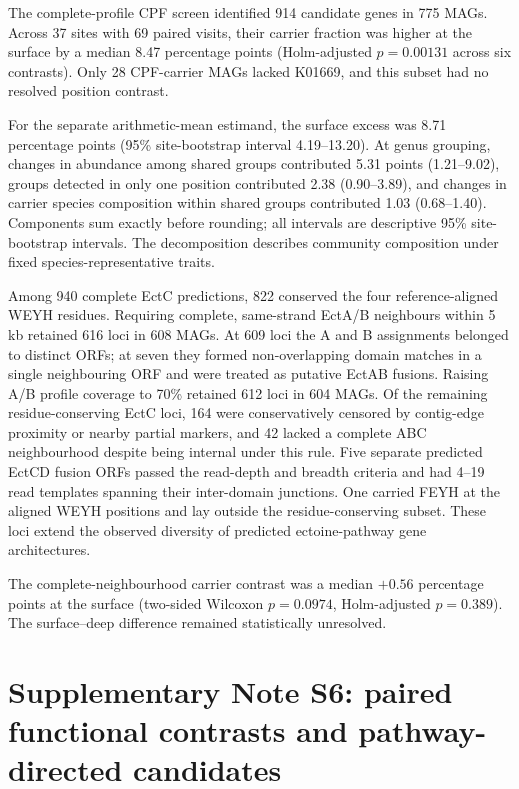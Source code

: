 The complete-profile CPF screen identified 914 candidate genes in 775 MAGs. Across 37 sites with 69 paired visits, their carrier fraction was higher at the surface by a median 8.47 percentage points (Holm-adjusted $p=0.00131$ across six contrasts). Only 28 CPF-carrier MAGs lacked K01669, and this subset had no resolved position contrast.

For the separate arithmetic-mean estimand, the surface excess was 8.71 percentage points (95\% site-bootstrap interval 4.19--13.20). At genus grouping, changes in abundance among shared groups contributed 5.31 points (1.21--9.02), groups detected in only one position contributed 2.38 (0.90--3.89), and changes in carrier species composition within shared groups contributed 1.03 (0.68--1.40). Components sum exactly before rounding; all intervals are descriptive 95\% site-bootstrap intervals.   The decomposition describes community composition under fixed species-representative traits.

Among 940 complete EctC predictions, 822 conserved the four reference-aligned WEYH residues. Requiring complete, same-strand EctA/B neighbours within 5 kb retained 616 loci in 608 MAGs. At 609 loci the A and B assignments belonged to distinct ORFs; at seven they formed non-overlapping domain matches in a single neighbouring ORF and were treated as putative EctAB fusions. Raising A/B profile coverage to 70\% retained 612 loci in 604 MAGs. Of the remaining residue-conserving EctC loci, 164 were conservatively censored by contig-edge proximity or nearby partial markers, and 42 lacked a complete ABC neighbourhood despite being internal under this rule. Five separate predicted EctCD fusion ORFs passed the read-depth and breadth criteria and had 4--19 read templates spanning their inter-domain junctions. One carried FEYH at the aligned WEYH positions and lay outside the residue-conserving subset. These loci extend the observed diversity of predicted ectoine-pathway gene architectures.

The complete-neighbourhood carrier contrast was a median $+0.56$ percentage points at the surface (two-sided Wilcoxon $p=0.0974$, Holm-adjusted $p=0.389$). The surface--deep difference remained statistically unresolved.

\section*{Supplementary Note S6: paired functional contrasts and pathway-directed candidates}

